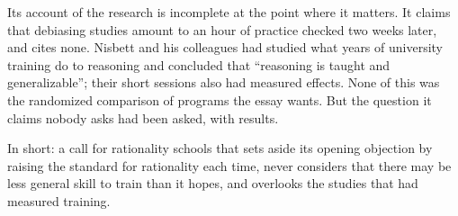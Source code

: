 \begin{afterword}
Its account of the research is incomplete at the point where it matters. It claims that debiasing studies amount to an hour of practice checked two weeks later, and cites none. Nisbett and his colleagues had studied what years of university training do to reasoning and concluded that ``reasoning is taught and generalizable''; their short sessions also had measured effects. None of this was the randomized comparison of programs the essay wants. But the question it claims nobody asks had been asked, with results.

In short: a call for rationality schools that sets aside its opening objection by raising the standard for rationality each time, never considers that there may be less general skill to train than it hopes, and overlooks the studies that had measured training.
\end{afterword}
